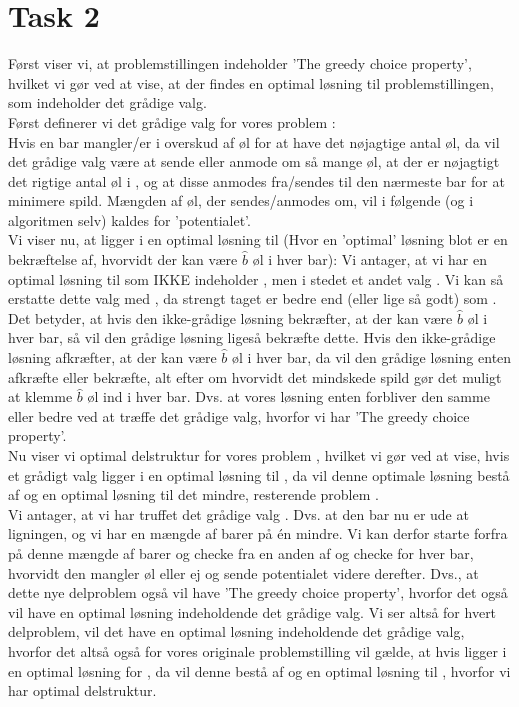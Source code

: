 \section{Task 2}

Først viser vi, at problemstillingen indeholder 'The greedy choice property', hvilket vi gør ved at vise, at der findes en optimal løsning til problemstillingen, som indeholder det grådige valg.\\
Først definerer vi det grådige valg  for vores problem :\\
Hvis en bar  mangler/er i overskud af  øl for at have det nøjagtige antal øl, da vil det grådige valg være at sende eller anmode om så mange øl, at der er nøjagtigt det rigtige antal øl i , og at disse anmodes fra/sendes til den nærmeste bar for at minimere spild. Mængden af øl, der sendes/anmodes om, vil i følgende (og i algoritmen selv) kaldes for 'potentialet'.\\
Vi viser nu, at  ligger i en optimal løsning til  (Hvor en 'optimal' løsning blot er en bekræftelse af, hvorvidt der kan være $\hat{b}$ øl i hver bar):
Vi antager, at vi har en optimal løsning til  som IKKE indeholder , men i stedet et andet valg . Vi kan så erstatte dette valg  med , da  strengt taget er bedre end (eller lige så godt) som . Det betyder, at hvis den ikke-grådige løsning bekræfter, at der kan være $\hat{b}$ øl i hver bar, så vil den grådige løsning ligeså bekræfte dette. Hvis den ikke-grådige løsning afkræfter, at der kan være $\hat{b}$ øl i hver bar, da vil den grådige løsning enten afkræfte eller bekræfte, alt efter om hvorvidt det mindskede spild gør det muligt at klemme $\hat{b}$ øl ind i hver bar. Dvs. at vores løsning enten forbliver den samme eller bedre ved at træffe det grådige valg, hvorfor vi har 'The greedy choice property'.\\
Nu viser vi optimal delstruktur for vores problem , hvilket vi gør ved at vise, hvis et grådigt valg  ligger i en optimal løsning til , da vil denne optimale løsning bestå af  og en optimal løsning til det mindre, resterende problem .\\
Vi antager, at vi har truffet det grådige valg .
Dvs. at den bar nu er ude at ligningen, og vi har en mængde af barer på én mindre. Vi kan derfor starte forfra på denne mængde af barer og checke fra en anden af og checke for hver bar, hvorvidt den mangler øl eller ej og sende potentialet videre derefter. Dvs., at dette nye delproblem  også vil have 'The greedy choice property', hvorfor det også vil have en optimal løsning indeholdende det grådige valg. Vi ser altså for hvert delproblem, vil det have en optimal løsning indeholdende det grådige valg, hvorfor det altså også for vores originale problemstilling  vil gælde, at hvis  ligger i en optimal løsning for , da vil denne bestå af  og en optimal løsning til , hvorfor vi har optimal delstruktur.

